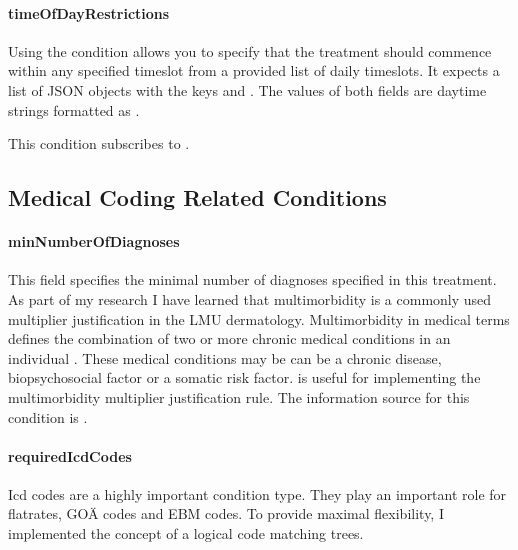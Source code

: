 \paragraph{timeOfDayRestrictions}
Using the  condition allows you to specify that the treatment should commence within any specified timeslot from a provided list of daily timeslots.
It expects a list of JSON objects with the keys  and .
The values of both fields are daytime strings formatted as .

This condition subscribes to .

\subsection{Medical Coding Related Conditions}\label{subsec:medical-coding-related-conditions}

\paragraph{minNumberOfDiagnoses}
This field specifies the minimal number of diagnoses specified in this treatment.
As part of my research I have learned that multimorbidity is a commonly used multiplier justification in the LMU dermatology.
Multimorbidity in medical terms defines the combination of two or more chronic medical conditions in an individual \cite{Reste2013The}.
These medical conditions may be can be a chronic disease, biopsychosocial factor or a somatic risk factor.
\minNumberOfDiagnoses is useful for implementing the multimorbidity multiplier justification rule.
The information source for this condition is .

\paragraph{requiredIcdCodes}

Icd codes are a highly important condition type.
They play an important role for flatrates, GOÄ codes and EBM codes.
To provide maximal flexibility, I implemented the concept of a logical code matching trees.



